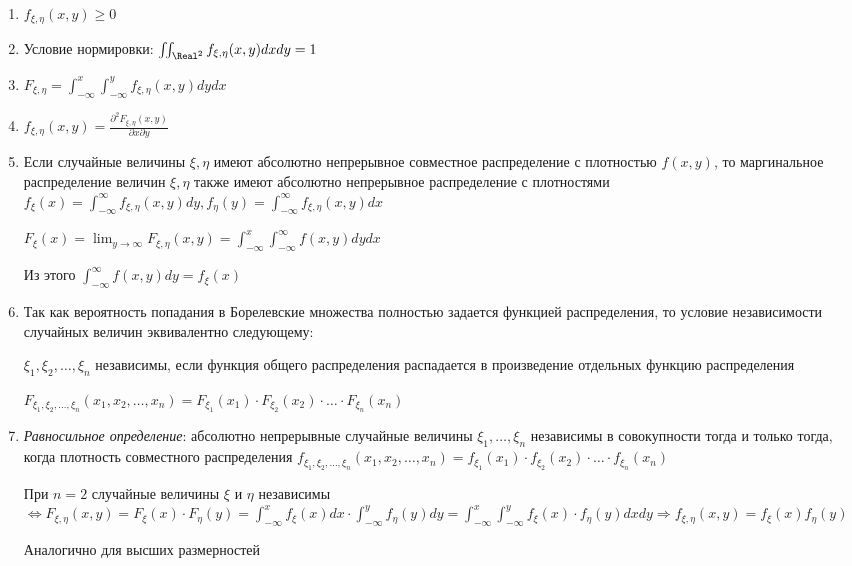 \documentclass[12pt]{article}
\begin{document}
    \begin{enumerate}
        \item $f_{\xi, \eta}(x, y) \geq 0$
        \item Условие нормировки: $\iint_{\Real^2} f_{\xi, \eta}(x, y) dxdy = 1$
        \item $F_{\xi, \eta} = \int_{-\infty}^x \int_{-\infty}^y f_{\xi, \eta}(x, y) dydx$

        \item $f_{\xi, \eta}(x, y) = \frac{\partial^2 F_{\xi, \eta}(x, y)}{\partial x \partial y}$
        
        \item Если случайные величины $\xi, \eta$ имеют абсолютно непрерывное совместное распределение с плотностью $f(x, y)$, 
        то маргинальное распределение величин $\xi, \eta$ также имеют абсолютно непрерывное распределение
        с плотностями $f_\xi(x) = \int_{-\infty}^\infty f_{\xi, \eta}(x, y) dy, f_\eta(y) = \int_{-\infty}^\infty f_{\xi, \eta}(x, y) dx$

        \begin{MyProof}
            $F_{\xi}(x) = \lim_{y \to \infty} F_{\xi, \eta}(x, y) = \int_{-\infty}^x \int_{-\infty}^\infty f(x, y) dydx$

            Из этого $\int_{-\infty}^\infty f(x, y) dy = f_\xi(x)$
        \end{MyProof}

        \item Так как вероятность попадания в Борелевские множества полностью задается функцией распределения, 
        то условие независимости случайных величин эквивалентно следующему:

        $\xi_1, \xi_2, \dots, \xi_n$ независимы, если функция общего распределения распадается в произведение 
        отдельных функцию распределения
    
        $F_{\xi_1, \xi_2, \dots, \xi_n}(x_1, x_2, \dots, x_n) = F_{\xi_1}(x_1) \cdot F_{\xi_2}(x_2) \cdot \dots \cdot F_{\xi_n}(x_n)$

        \item \textit{Равносильное определение}: абсолютно непрерывные случайные величины $\xi_1, \dots, \xi_n$ независимы в совокупности тогда и только тогда, 
        когда плотность совместного распределения $f_{\xi_1, \xi_2, \dots, \xi_n}(x_1, x_2, \dots, x_n) = f_{\xi_1}(x_1) \cdot f_{\xi_2}(x_2) \cdot \dots \cdot f_{\xi_n}(x_n)$
    
        \begin{MyProof}
            При $n = 2$ случайные величины $\xi$ и $\eta$ независимы $\Longleftrightarrow F_{\xi, \eta}(x, y) = F_\xi(x) \cdot F_\eta(y) = \int_{-\infty}^x f_\xi(x) dx \cdot \int_{-\infty}^y f_\eta(y) dy = \int_{-\infty}^x \int_{-\infty}^y f_\xi(x) \cdot f_\eta(y) dxdy \Longrightarrow f_{\xi,\eta}(x, y) = f_\xi(x)f_\eta(y)$

            Аналогично для высших размерностей
        \end{MyProof}

    \end{enumerate}
\end{document}
